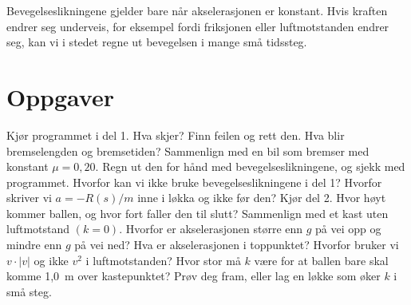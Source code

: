 \documentclass[11pt]{article}
\begin{document}

Bevegelseslikningene gjelder bare når akselerasjonen er konstant. Hvis kraften endrer seg underveis, for eksempel fordi friksjonen eller luftmotstanden endrer seg, kan vi i stedet regne ut bevegelsen i mange små tidssteg.

\section*{Oppgaver}

\begin{oppgaveliste}
\oppgave {}Kjør programmet i del 1. Hva skjer? Finn feilen og rett den.
\svar
\oppgave {}Hva blir bremselengden og bremsetiden? Sammenlign med en bil som bremser med konstant $μ = 0{,}20$. Regn ut den for hånd med bevegelseslikningene, og sjekk med programmet.
\svar
\oppgave {}Hvorfor kan vi ikke bruke bevegelseslikningene i del 1? Hvorfor skriver vi $a = -R(s)/m$ inne i løkka og ikke før den?
\svar
\oppgave {}Kjør del 2. Hvor høyt kommer ballen, og hvor fort faller den til slutt? Sammenlign med et kast uten luftmotstand $(k = 0)$.
\svar
\oppgave {}Hvorfor er akselerasjonen større enn $g$ på vei opp og mindre enn $g$ på vei ned? Hva er akselerasjonen i toppunktet?
\svar
\oppgave {}Hvorfor bruker vi $v \cdot |v|$ og ikke $v^{2}$ i luftmotstanden?
\svar
\oppgave {}Hvor stor må $k$ være for at ballen bare skal komme 1,0~m over kastepunktet? Prøv deg fram, eller lag en løkke som øker $k$ i små steg.
\svar
\end{oppgaveliste}
\end{document}
